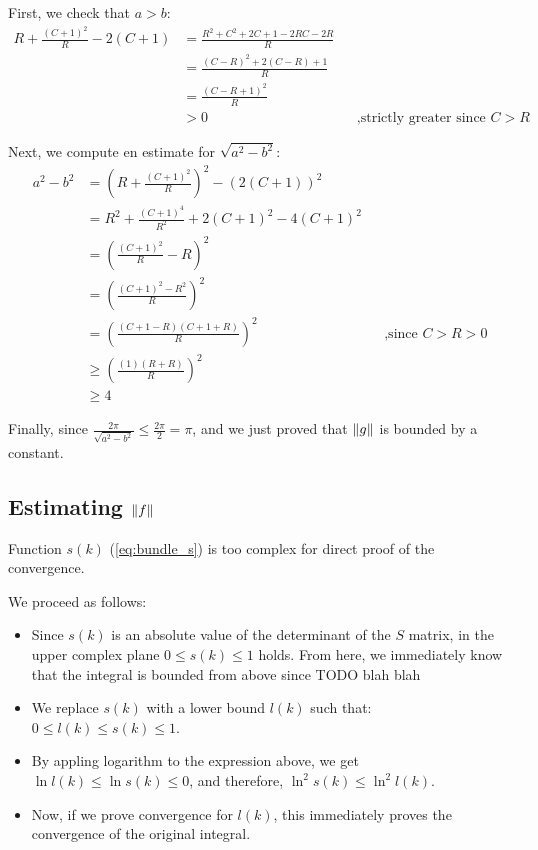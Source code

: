 \documentclass[12pt, a4paper]{article}
\theoremstyle{plain}
\DeclarePairedDelimiter\norm{\lVert}{\rVert}%
\begin{document}
First, we check that $a > b$:
\begin{align*}
   R + \frac{(C + 1)^2}{R} - 2 (C + 1)
   &= \frac{R^2 + C^2 + 2C + 1 - 2 RC - 2 R}{R}
\\ &= \frac{(C - R)^2 + 2(C - R) + 1}{R}
\\ &= \frac{(C - R + 1)^2 }{R}
\\ &> 0 && \text{,strictly greater since $C > R$} 
\end{align*}

Next, we compute en estimate for $\sqrt{a^2 - b^2}$:
\begin{align*}
a^2 - b^2
& =  (R + \frac{(C + 1)^2}{R})^2 - (2 (C + 1))^2\\
& =  R^2 + \frac{(C+1)^4}{R^2} + 2 (C+1)^2 - 4 (C + 1)^2 \\
& =  \left( \frac{(C + 1)^2}{R} - R \right)^2 \\
& =  \left( \frac{(C + 1)^2 - R^2}{R}\right)^2 \\
& =  \left( \frac{(C + 1 - R) (C + 1 + R)}{R}\right)^2 && \text{,since $C > R > 0$} \\
&\ge \left( \frac{(1) (R + R)}{R}\right)^2  \\
&\ge 4
\end{align*}

Finally, since $\frac{2 \pi}{\sqrt{a^2 - b^2}} \le \frac{2 \pi}{2} = \pi$, and we just proved that $\norm{g}$ is bounded by a constant. 


\subsection{Estimating $\norm{f}$}
Function $s(k)$ (\ref{eq:bundle_s}) is too complex for direct proof of the convergence.

We proceed as follows:

\begin{itemize}
\item Since $s(k)$ is an absolute value of the determinant of the $S$ matrix, in the upper complex plane $0 \le s(k) \le 1$ holds. From here, we immediately know that the integral is bounded from above since TODO blah blah
\item We replace $s(k)$ with a lower bound $l(k)$ such that: $0 \le l(k) \le s(k) \le 1$.
\item By appling logarithm to the expression above, we get $\ln l(k) \le \ln s(k) \le 0$, and therefore, $\ln^2 s(k) \le \ln^2 l(k)$.
\item Now, if we prove convergence for $l(k)$, this immediately proves the convergence of the original integral.
\end{itemize}
\end{document}
